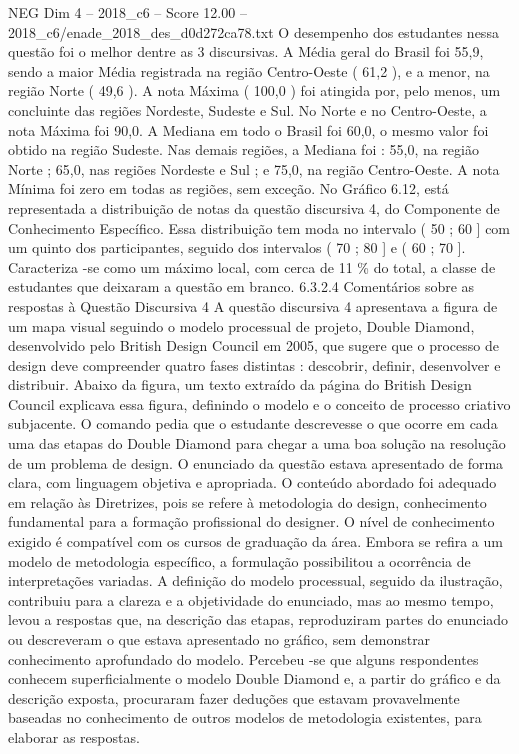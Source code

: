 \begin{textsample}{NEG Dim 4 – 2018\_c6 – Score 12.00 – 2018\_c6/enade\_2018\_des\_d0d272ca78.txt}
O desempenho dos estudantes nessa questão foi o melhor dentre as 3 discursivas.
A Média geral do Brasil foi 55,9, sendo a maior Média registrada na região Centro-Oeste ( 61,2 ), e a menor, na região Norte ( 49,6 ).
A nota Máxima ( 100,0 ) foi atingida por, pelo menos, um concluinte das regiões Nordeste, Sudeste e Sul.
No Norte e no Centro-Oeste, a nota Máxima foi 90,0.
A Mediana em todo o Brasil foi 60,0, o mesmo valor foi obtido na região Sudeste.
Nas demais regiões, a Mediana foi : 55,0, na região Norte ; 65,0, nas regiões Nordeste e Sul ; e 75,0, na região Centro-Oeste.
A nota Mínima foi zero em todas as regiões, sem exceção.
No Gráfico 6.12, está representada a distribuição de notas da questão discursiva 4, do Componente de Conhecimento Específico.
Essa distribuição tem moda no intervalo ( 50 ; 60 ] com um quinto dos participantes, seguido dos intervalos ( 70 ; 80 ] e ( 60 ; 70 ].
Caracteriza -se como um máximo local, com cerca de 11 \% do total, a classe de estudantes que deixaram a questão em branco. 6.3.2.4 Comentários sobre as respostas à Questão Discursiva 4 A questão discursiva 4 apresentava a figura de um mapa visual seguindo o modelo processual de projeto, Double Diamond, desenvolvido pelo British Design Council em 2005, que sugere que o processo de design deve compreender quatro fases distintas : descobrir, definir, desenvolver e distribuir.
Abaixo da figura, um texto extraído da página do British Design Council explicava essa figura, definindo o modelo e o conceito de processo criativo subjacente.
O comando pedia que o estudante descrevesse o que ocorre em cada uma das etapas do Double Diamond para chegar a uma boa solução na resolução de um problema de design.
O enunciado da questão estava apresentado de forma clara, com linguagem objetiva e apropriada.
O conteúdo abordado foi adequado em relação às Diretrizes, pois se refere à metodologia do design, conhecimento fundamental para a formação profissional do designer.
O nível de conhecimento exigido é compatível com os cursos de graduação da área.
Embora se refira a um modelo de metodologia específico, a formulação possibilitou a ocorrência de interpretações variadas.
A definição do modelo processual, seguido da ilustração, contribuiu para a clareza e a objetividade do enunciado, mas ao mesmo tempo, levou a respostas que, na descrição das etapas, reproduziram partes do enunciado ou descreveram o que estava apresentado no gráfico, sem demonstrar conhecimento aprofundado do modelo.
Percebeu -se que alguns respondentes conhecem superficialmente o modelo Double Diamond e, a partir do gráfico e da descrição exposta, procuraram fazer deduções que estavam provavelmente baseadas no conhecimento de outros modelos de metodologia existentes, para elaborar as respostas.

\end{textsample}
